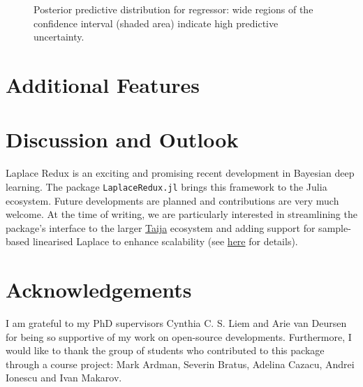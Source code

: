 \documentclass{juliacon}
\begin{document}
\begin{figure}


\caption{\label{fig-reg}Posterior predictive distribution for regressor:
wide regions of the confidence interval (shaded area) indicate high
predictive uncertainty.}

\end{figure}%

\section{Additional Features}\label{sec-add}

\section{Discussion and Outlook}\label{sec-con}

Laplace Redux is an exciting and promising recent development in
Bayesian deep learning. The package \texttt{LaplaceRedux.jl} brings this
framework to the Julia ecosystem. Future developments are planned and
contributions are very much welcome. At the time of writing, we are
particularly interested in streamlining the package's interface to the
larger \href{https://github.com/JuliaTrustworthyAI}{Taija} ecosystem and
adding support for sample-based linearised Laplace to enhance
scalability (see
\href{https://github.com/JuliaTrustworthyAI/LaplaceRedux.jl/issues/34}{here}
for details).

\section{Acknowledgements}\label{sec-ack}

I am grateful to my PhD supervisors Cynthia C. S. Liem and Arie van
Deursen for being so supportive of my work on open-source developments.
Furthermore, I would like to thank the group of students who contributed
to this package through a course project: Mark Ardman, Severin Bratus,
Adelina Cazacu, Andrei Ionescu and Ivan Makarov.


\printbibliography
\end{document}
